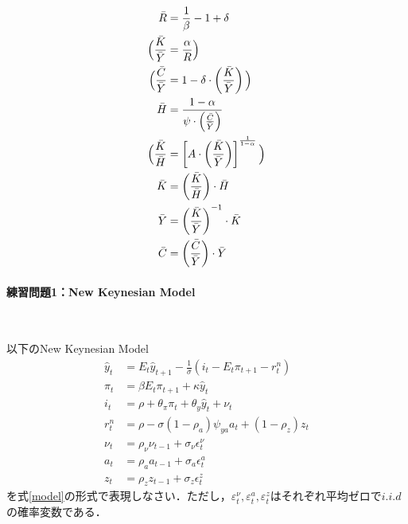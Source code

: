 \documentclass[a4j, dvipdfmx]{jarticle}
\begin{document}
\begin{align}
\bar R &= \frac{1}{\beta}-1+\delta\\
\Big(\frac{\bar K}{\bar Y} &= \frac{\alpha}{R}\Big)\notag\\
\Big(\frac{\bar C}{\bar Y} &= 1-\delta\cdot\left(\frac{\bar K}{\bar Y}\right)\Big)\notag\\
\bar H &= \frac{1-\alpha}{\psi\cdot\left(\frac{\bar C}{\bar Y}\right)}\\
\Big(\frac{\bar K}{\bar H} &= \left[A\cdot\left(\frac{\bar K}{\bar Y}\right)\right]^{\frac{1}{1-\alpha}}\Big)\notag\\
\bar K &= \left(\frac{\bar K}{\bar H}\right)\cdot \bar H\\
\bar Y &= \left(\frac{\bar K}{\bar Y}\right)^{-1}\cdot \bar K\\
\bar C &= \left(\frac{\bar C}{\bar Y}\right) \cdot \bar Y
\end{align}


\paragraph{練習問題1：New Keynesian Model}~

以下のNew Keynesian Model
\begin{align}
\hat{y}_t &= E_t \hat{y}_{t+1} -\frac{1}{\sigma} (i_t - E_t\pi_{t+1} - r^n_t) \\
\pi_t &= \beta E_t\pi_{t+1} + \kappa \hat{y}_t\\
i_t &= \rho + \theta_\pi \pi_t + \theta_y \hat{y}_t + \nu_t \\
r^n_t &= \rho - \sigma (1-\rho_a) \psi_{ya} a_t +(1-\rho_z)z_t\\
\nu_t &= \rho_\nu \nu_{t-1} + \sigma_\nu \epsilon^\nu_t\\
a_t &= \rho_a a_{t-1} + \sigma_a \epsilon^a_t\\
z_t &= \rho_z z_{t-1} + \sigma_z \epsilon^z_t
\end{align}
を式\eqref{model}の形式で表現しなさい．ただし，$\varepsilon^\nu_t, \varepsilon^a_t, \varepsilon^z_t$はそれぞれ平均ゼロで$i.i.d$の確率変数である．
\end{document}
